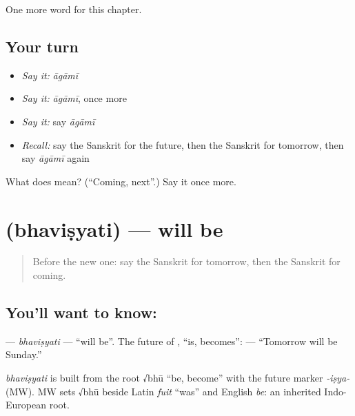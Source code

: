 \begin{grammarlens}[title={What you've built}]
One more word for this chapter.
\end{grammarlens}

\subsection*{Your turn}
\begin{itemize}
\raggedright
  \item \emph{Say it:} \emph{āgāmī}
  \item \emph{Say it:} \emph{āgāmī}, once more
  \item \emph{Say it:} say \emph{āgāmī}
  \item \emph{Recall:} say the Sanskrit for the future, then the Sanskrit for tomorrow, then say \emph{āgāmī} again
\end{itemize}

\begin{tcolorbox}[breakable,colback=teal!4,colframe=teal!35!black,title={Before you move on}]
What does  mean? (\textquotedblleft{}Coming, next\textquotedblright{}.) Say it once more.
\end{tcolorbox}
\section[\texorpdfstring{\sk{भविष्यति} (bhaviṣyati)}{भविष्यति (bhaviṣyati)}]{ (bhaviṣyati) — will be}

\label{lesson:SA-C139-bhavisyati}



\begin{quote}
Before the new one: say the Sanskrit for tomorrow, then the Sanskrit for coming.
\end{quote}

\subsection*{You'll want to know: }
\textbf{} — \emph{bhaviṣyati} — \textquotedblleft{}will be\textquotedblright{}. The future of \textbf{}, \textquotedblleft{}is, becomes\textquotedblright{}: \textbf{  } — \textquotedblleft{}Tomorrow will be Sunday.\textquotedblright{}

\begin{cousinweb}
\emph{bhaviṣyati} is built from the root √bhū \textquotedblleft{}be, become\textquotedblright{} with the future marker \emph{-iṣya-} (MW). MW sets √bhū beside Latin \emph{fuit} \textquotedblleft{}was\textquotedblright{} and English \emph{be}: an inherited Indo-European root.
\end{cousinweb}

